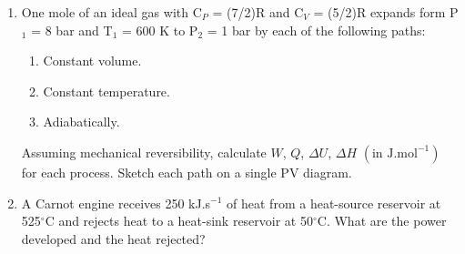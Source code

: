 \documentclass[12pts,a4paper,amsmath,amssymb,floatfix]{article}%
\renewcommand{\d}{\mathrm{d}}
\begin{document}
\begin{enumerate}[label=\bfseries Problem \arabic*:]
\item\label{Tut02:IdealGas2} One mole of an ideal gas with C$_{P}$ = (7/2)R and C$_{V}$ = (5/2)R expands form P$_{1}$ = 8 bar and T$_{1}$ = 600 K to P$_{2}$ = 1 bar by each of the following paths:
\begin{enumerate}
\item Constant volume.%
\item Constant temperature.%
\item Adiabatically.%
\end{enumerate}
Assuming mechanical reversibility, calculate $W$, $Q$, $\Delta U$, $\Delta H$ $\left(\text{in J.mol}^{-1}\right)$ for each process. Sketch each path on a single PV diagram.


\item\label{Tut02:Carnot}A Carnot engine receives 250 kJ.s$^{-1}$ of heat from a heat-source reservoir at 525$^{\circ}$C and rejects heat to a heat-sink reservoir at 50$^{\circ}$C. What are the power developed and the heat rejected?%

\begin{comment}

\item\label{Tut02:IdealGas3}An ideal gas at 2500 kPa is throttled adiabatically to 150 kPa at the rate of 20 gmol.s$^{-1}$. Determine the rate of entropy generation if the surrounding temperature is T$_{0}$ = 300 K. %


\item\label{Tut02:CylinderPiston2}One kilogram of water $\left(\text{V}_{1} = \text{1003 cm}^{3}\text{.kg}^{-1}\right)$ in a piston/cylinder device at 25$^{\circ}$C and 1 bar is compressed in a mechanically reversible, isothermal process to 1500 bar. Determine $Q$, $W$, $\Delta U$, $\Delta H$ and $\Delta S$ given that $\beta$ = 250$\times$10$^{-6}$ K$^{-1}$ and $\kappa$ = 45$\times$10$^{-6}$ bar$^{-1}$. A satisfactory assumption is that $V$ is at its arithmetic average value. As a $PVT$ equation of state use:%
\begin{displaymath}
\displaystyle\frac{\d V}{V} = \beta \d T - \kappa \d P
\end{displaymath}

\end{comment}


\end{enumerate}
\end{document}

